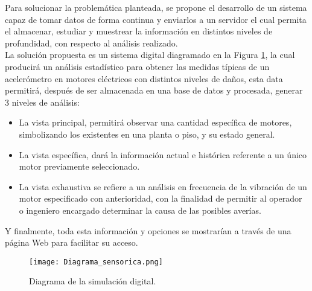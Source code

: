 

Para solucionar la problemática planteada, se propone el desarrollo de un sistema capaz de tomar datos de forma continua y enviarlos  a un servidor el cual permita el almacenar, estudiar y muestrear la información en distintos niveles de profundidad, con respecto al análisis realizado.\\


La solución propuesta es un sistema digital diagramado en la Figura \ref{diagrama}, la cual producirá un análisis estadístico para obtener las medidas típicas de un acelerómetro en motores eléctricos con distintos niveles de daños, esta data permitirá, después de ser almacenada en una base de datos y procesada, generar 3 niveles de análisis:\\


\begin{itemize}
\item La vista principal, permitirá observar una cantidad específica de motores, simbolizando los existentes en una planta o piso, y su estado general.

\item La vista específica, dará la información actual e histórica referente a un único motor previamente seleccionado.

\item La vista exhaustiva se refiere a un análisis en frecuencia de la vibración de un motor especificado con anterioridad, con la finalidad de permitir al operador o ingeniero encargado determinar la causa de las posibles averías.
\end{itemize}


Y finalmente, toda esta información y opciones se mostrarían a través de una página Web para facilitar su acceso.\\



\begin{figure}[htb]
\centering
\caption{Diagrama de la simulación digital.}
\label{diagrama}
\texttt{[image: Diagrama\_sensorica.png]}
\end{figure}
